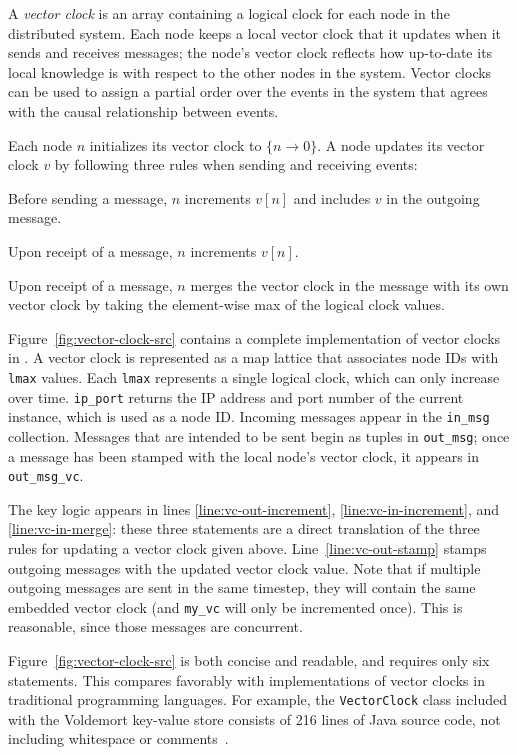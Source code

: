 A \emph{vector clock} is an array containing a logical clock for each node in
the distributed system. Each node keeps a local vector clock that it updates
when it sends and receives messages; the node's vector clock reflects how
up-to-date its local knowledge is with respect to the other nodes in the
system. Vector clocks can be used to assign a partial order over the events in
the system that agrees with the causal relationship between events.

Each node $n$ initializes its vector clock to $\{n \rightarrow 0\}$. A node
updates its vector clock $v$ by following three rules when sending and receiving
events:
\begin{compactenum}
\item
  Before sending a message, $n$ increments $v[n]$ and includes $v$ in the
  outgoing message.
\item
  Upon receipt of a message, $n$ increments $v[n]$.
\item
  Upon receipt of a message, $n$ merges the vector clock in the message with its
  own vector clock by taking the element-wise max of the logical clock values.
\end{compactenum}
Figure~\ref{fig:vector-clock-src} contains a complete implementation of vector
clocks in \lang. A vector clock is represented as a map lattice that associates
node IDs with \texttt{lmax} values. Each \texttt{lmax} represents a single
logical clock, which can only increase over time. \texttt{ip\_port} returns the
IP address and port number of the current \lang instance, which is used as a
node ID. Incoming messages appear in the \texttt{in\_msg} collection. Messages
that are intended to be sent begin as tuples in \texttt{out\_msg}; once a
message has been stamped with the local node's vector clock, it appears in
\texttt{out\_msg\_vc}.

The key logic appears in lines \ref{line:vc-out-increment},
\ref{line:vc-in-increment}, and \ref{line:vc-in-merge}: these three statements
are a direct translation of the three rules for updating a vector clock given
above. Line~\ref{line:vc-out-stamp} stamps outgoing messages with the updated
vector clock value.  Note that if multiple outgoing messages are sent in the
same \lang timestep, they will contain the same embedded vector clock (and
\texttt{my\_vc} will only be incremented once). This is reasonable, since those
messages are concurrent.

Figure~\ref{fig:vector-clock-src} is both concise and readable, and requires
only six \lang statements. This compares favorably with implementations of
vector clocks in traditional programming languages. For example, the
\texttt{VectorClock} class included with the Voldemort key-value store consists
of 216 lines of Java source code, not including whitespace or
comments~\cite{voldemort-vector-clock}.


